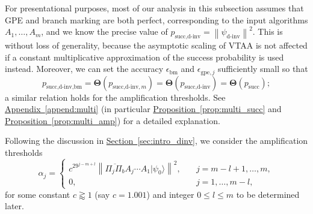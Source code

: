 \documentclass[letterpaper,onecolumn,11pt,accepted=2026-02-14]{quantumarticle}
\newcommand{\norm}[1]{\left\lVert#1\right\rVert}
\theoremstyle{remark}
\theoremstyle{plain}
\newcommand{\prop}[1]{\hyperref[prop:#1]{Proposition~\ref*{prop:#1}}}
\renewcommand{\sec}[1]{\hyperref[sec:#1]{Section~\ref*{sec:#1}}}
\newcommand{\append}[1]{\hyperref[append:#1]{Appendix~\ref*{append:#1}}}
\newcommand{\ket}[1]{|#1\rangle}
\begin{document}
For presentational purposes, most of our analysis in this subsection assumes that GPE and branch marking are both perfect, corresponding to the input algorithms $A_1,\ldots,A_m$, and we know the precise value of $p_{\text{succ,d-inv}}=\norm{\psi_{\text{d-inv}}}^2$. This is without loss of generality, because the asymptotic scaling of VTAA is not affected if a constant multiplicative approximation of the success probability is used instead.
Moreover, we can set the accuracy $\epsilon_{\text{bm}}$ and $\epsilon_{\text{gpe},j}$ sufficiently small so that
\begin{equation*}
    p_{\text{succ,d-inv,bm}}=\mathbf{\Theta}\left(p_{\text{succ,d-inv},m}\right)=\mathbf{\Theta}\left(p_{\text{succ,d-inv}}\right)=\mathbf{\Theta}\left(p_{\text{succ}}\right);
\end{equation*}
a similar relation holds for the amplification thresholds. See \append{multi} (in particular \prop{multi_succ} and \prop{multi_amp}) for a detailed explanation.

Following the discussion in \sec{intro_dinv}, we consider the amplification thresholds
\begin{equation}
\label{eq:threshold_def}
    \alpha_j=
    \begin{cases}
        c^29^{j-m+l}\norm{\overline{\Pi_j\Pi_b}A_j\cdots A_1\ket{\psi_0}}^2,\quad&j=m-l+1,\ldots,m,\\
        0,&j=1,\ldots,m-l,
    \end{cases}
\end{equation}
for some constant $c\gtrapprox 1$ (say $c=1.001$) and integer $0\leq l\leq m$ to be determined later.
\end{document}
